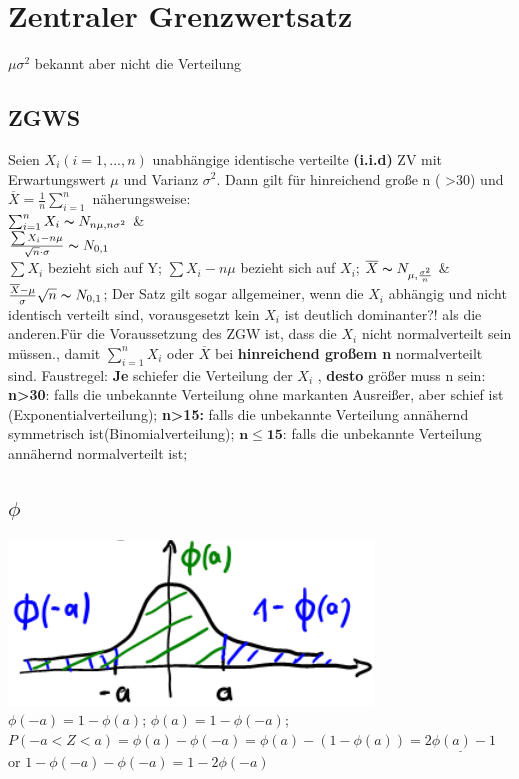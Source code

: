 \section{Zentraler Grenzwertsatz}
$\mu \sigma^2$ bekannt aber nicht die Verteilung
\subsection{ZGWS}
Seien $ X_{i} (i=1, ..., n)$ unabhängige identische verteilte \textbf{(i.i.d)} ZV mit Erwartungswert $\mu$ und Varianz
$ \sigma^2 $. Dann gilt für hinreichend große n ( >30) und $\overline{X} = \frac{1}{n} \sum_{i=1}^{n}$ näherungsweise:\\
$\sum_{i=1}^{n} X_{i}  \thicksim  N_{n\mu, n\sigma^2}$  \&\\
$\frac{\sum X_{i}-n\mu}{\sqrt{n}\cdot \sigma} \thicksim N_{0,1} $\\
$\sum X_{i} $ bezieht sich auf Y; $\sum X_{i} - n\mu$ bezieht sich auf $ X_{i}$; 
$ \overline{X} \thicksim N_{\mu, \frac{\sigma^2}{n}} $ \& $ \frac{\overline{X}-\mu}{\sigma} \sqrt{n} \thicksim N_{0,1} $; 
Der Satz gilt sogar allgemeiner, wenn die $X_{i}$ abhängig und nicht identisch verteilt sind, vorausgesetzt kein $ X_{i} $ ist deutlich dominanter?! als die anderen.Für die Voraussetzung des  ZGW ist, dass die $ X_{i} $ nicht normalverteilt sein müssen., damit $\sum_{i=1}^{n} X_{i}$ oder $\overline{X}$  bei \textbf{hinreichend großem n} normalverteilt sind. Faustregel: \textbf{Je} schiefer die Verteilung der $ X_{i}$ , \textbf{desto} größer muss n sein: 
\textbf{n>30}: falls die unbekannte Verteilung ohne markanten Ausreißer, aber schief ist (Exponentialverteilung); 
\textbf{n>15:} falls die unbekannte Verteilung annähernd symmetrisch ist(Binomialverteilung); 
$ \boldsymbol{ n \le 15 }$: falls die unbekannte Verteilung annähernd normalverteilt ist; 
\subsection{$\phi$}
\includegraphics[scale=0.25]{./pic/ZGWPhiVerteilung.png} $ \phi(-a ) = 1 - \phi(a) $; $\phi(a) = 1-\phi(-a) $; 
$ P(-a < Z < a) = \phi(a) - \phi(-a) = \phi(a) - (1-\phi(a)) = \underline{ 2\phi(a) -1 } $ or $ 1-\phi(-a) - \phi(-a) = 1 -2\phi(-a)$
